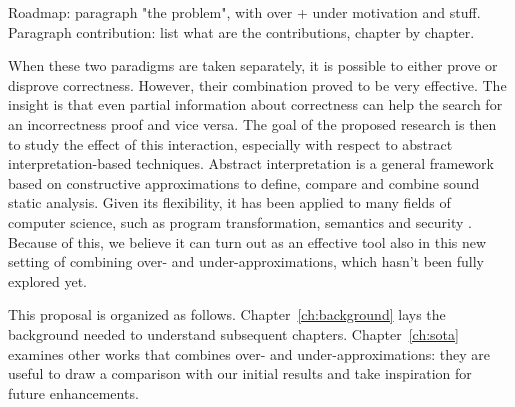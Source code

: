 \fromhere
Roadmap: paragraph "the problem", with over + under motivation and stuff. Paragraph contribution: list what are the contributions, chapter by chapter.

When these two paradigms are taken separately, it is possible to either prove or disprove correctness. However, their combination proved to be very effective. The insight is that even partial information about correctness can help the search for an incorrectness proof and vice versa. The goal of the proposed research is then to study the effect of this interaction, especially with respect to abstract interpretation-based techniques.
Abstract interpretation \cite{CC77,RY20} is a general framework based on constructive approximations to define, compare and combine sound static analysis. Given its flexibility, it has been applied to many fields of computer science, such as program transformation, semantics and security \cite{CC14}. Because of this, we believe it can turn out as an effective tool also in this new setting of combining over- and under-approximations, which hasn't been fully explored yet.

This proposal is organized as follows. Chapter~\ref{ch:background} lays the background needed to understand subsequent chapters. Chapter~\ref{ch:sota} examines other works that combines over- and under-approximations: they are useful to draw a comparison with our initial results and take inspiration for future enhancements.
